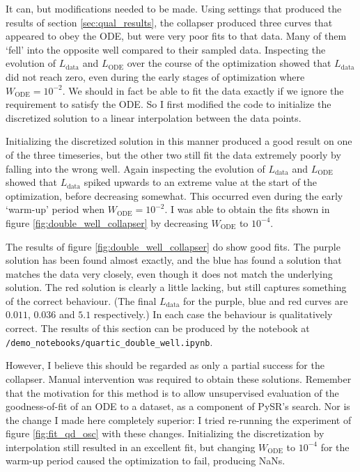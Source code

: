 \documentclass{article}
\begin{document}
It can, but modifications needed to be made.
Using settings that produced the results of section \ref{sec:qual_results}, the collapser produced three curves that appeared to obey the ODE, but were very poor fits to that data.
Many of them `fell' into the opposite well compared to their sampled data.
Inspecting the evolution of $L_{\mathrm{data}}$ and $L_{\mathrm{ODE}}$ over the course of the optimization showed that $L_{\mathrm{data}}$ did not reach zero, even during the early stages of optimization where $W_{\mathrm{ODE}} = 10^{-2}$.
We should in fact be able to fit the data exactly if we ignore the requirement to satisfy the ODE.
So I first modified the code to initialize the discretized solution to a linear interpolation between the data points.

Initializing the discretized solution in this manner produced a good result on one of the three timeseries, but the other two still fit the data extremely poorly by falling into the wrong well.
Again inspecting the evolution of $L_{\mathrm{data}}$ and $L_{\mathrm{ODE}}$ showed that $L_{\mathrm{data}}$ spiked upwards to an extreme value at the start of the optimization, before decreasing somewhat.
This occurred even during the early `warm-up' period when $W_{\mathrm{ODE}} = 10^{-2}$.
I was able to obtain the fits shown in figure \ref{fig:double_well_collapser} by decreasing $W_{\mathrm{ODE}}$ to $10^{-4}$.

The results of figure \ref{fig:double_well_collapser} do show good fits.
The purple solution has been found almost exactly, and the blue has found a solution that matches the data very closely, even though it does not match the underlying solution.
The red solution is clearly a little lacking, but still captures something of the correct behaviour.
(The final $L_{\mathrm{data}}$ for the purple, blue and red curves are $0.011$, $0.036$ and $5.1$ respectively.)
In each case the behaviour is qualitatively correct.
The results of this section can be produced by the notebook at \texttt{/demo\_notebooks/quartic\_double\_well.ipynb}.

However, I believe this should be regarded as only a partial success for the collapser.
Manual intervention was required to obtain these solutions.
Remember that the motivation for this method is to allow unsupervised evaluation of the goodness-of-fit of an ODE to a dataset, as a component of PySR's search.
Nor is the change I made here completely superior: I tried re-running the experiment of figure \ref{fig:fit_qd_osc} with these changes.
Initializing the discretization by interpolation still resulted in an excellent fit, but changing $W_{\mathrm{ODE}}$ to $10^{-4}$ for the warm-up period caused the optimization to fail, producing NaNs.
\end{document}
